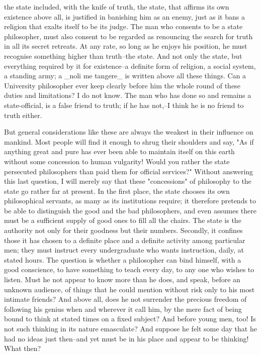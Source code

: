 the state included, with the knife of truth, the state, that affirms
its own existence above all, is justified in banishing him as an
enemy, just as it bans a religion that exalts itself to be its judge.
The man who consents to be a state philosopher, must also consent to
be regarded as renouncing the search for truth in all its secret
retreats. At any rate, so long as he enjoys his position, he must
recognise something higher than truth--the state. And not only the
state, but everything required by it for existence--a definite form
of religion, a social system, a standing army; a _noli me tangere_ is
written above all these things. Can a University philosopher ever
keep clearly before him the whole round of these duties and
limitations? I do not know. The man who has done so and remains a
state-official, is a false friend to truth; if he has not,--I think
he is no friend to truth either.

But general considerations like these are always the weakest in their
influence on mankind. Most people will find it enough to shrug their
shoulders and say, "As if anything great and pure has ever been able
to maintain itself on this earth without some concession to human
vulgarity! Would you rather the state persecuted philosophers than
paid them for official services?" Without answering this last
question, I will merely say that these "concessions" of philosophy to
the state go rather far at present. In the first place, the state
chooses its own philosophical servants, as many as its institutions
require; it therefore pretends to be able to distinguish the good and
the bad philosophers, and even assumes there must be a sufficient
supply of good ones to fill all the chairs. The state is the
authority not only for their goodness but their numbers. Secondly, it
confines those it has chosen to a definite place and a definite
activity among particular men; they must instruct every undergraduate
who wants instruction, daily, at stated hours. The question is
whether a philosopher can bind himself, with a good conscience, to
have something to teach every day, to any one who wishes to listen.
Must he not appear to know more than he does, and speak, before an
unknown audience, of things that he could mention without risk only
to his most intimate friends? And above all, does he not surrender
the precious freedom of following his genius when and wherever it
call him, by the mere fact of being bound to think at stated times on
a fixed subject? And before young men, too! Is not such thinking in
its nature emasculate? And suppose he felt some day that he had no
ideas just then--and yet must be in his place and appear to be
thinking! What then?

